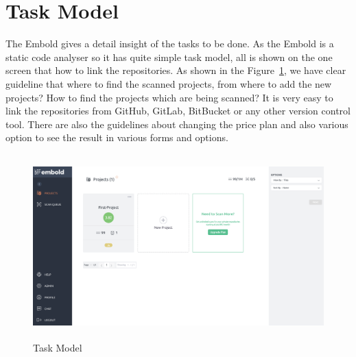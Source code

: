 \section{Task Model}
The Embold gives a detail insight of the tasks to be done. As the Embold is a static code analyser so it has quite simple task model, all is shown on the one screen that how to link the repositories. As shown in the Figure~\ref{fig:Task},  we have clear guideline that where to find the scanned projects, from where to add the new projects? How to find the projects which are being scanned? It is very easy to link the repositories from GitHub, GitLab, BitBucket or any other version control tool. There are also the guidelines about changing the price plan and also various option to see the result in various forms and options.
\begin{figure}[htbp]
\begin{center}
\includegraphics[width=6.5in, height=2.8in]{task-model.png}
\caption{Task Model}
\label{fig:Task}
\end{center}
\end{figure}


